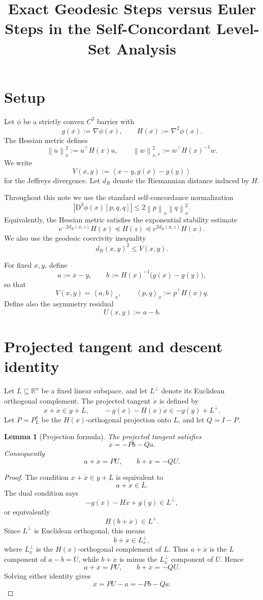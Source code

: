 \documentclass[11pt]{article}
\title{Exact Geodesic Steps versus Euler Steps in the Self-Concordant Level-Set Analysis}
\author{}
\date{}
\newtheorem{lemma}{Lemma}
\newcommand{\ip}[2]{\left\langle #1,#2\right\rangle}
\newcommand{\norm}[1]{\left\lVert #1\right\rVert}
\newcommand{\R}{\mathbb R}
\newcommand{\D}{\mathrm D}
\begin{document}
\maketitle

\section{Setup}

Let $\phi$ be a strictly convex $C^3$ barrier with
\[
    g(x):=\nabla \phi(x),
    \qquad
    H(x):=\nabla^2\phi(x).
\]
The Hessian metric defines
\[
    \norm{u}_x^2:=u^\top H(x)u,
    \qquad
    \norm{w}_{x,*}^2:=w^\top H(x)^{-1}w.
\]
We write
\[
    V(x,y):=\ip{x-y}{g(x)-g(y)}
\]
for the Jeffreys divergence. Let $d_R$ denote the Riemannian distance induced by $H$.

Throughout this note we use the standard self-concordance normalization
\[
    |\D^3\phi(x)[p,q,q]|
    \le
    2\norm{p}_x\norm{q}_x^2.
\]
Equivalently, the Hessian metric satisfies the exponential stability estimate
\[
    e^{-2d_R(x,z)}H(x)
    \preceq
    H(z)
    \preceq
    e^{2d_R(x,z)}H(x).
\]
We also use the geodesic coercivity inequality
\[
    d_R(x,y)^2\le V(x,y).
\]

For fixed $x,y$, define
\[
    a:=x-y,
    \qquad
    b:=H(x)^{-1}\bigl(g(x)-g(y)\bigr),
\]
so that
\[
    V(x,y)=\ip{a}{b}_x,
    \qquad
    \ip{p}{q}_x:=p^\top H(x)q.
\]
Define also the asymmetry residual
\[
    U(x,y):=a-b.
\]

\section{Projected tangent and descent identity}

Let $L\subseteq \R^n$ be a fixed linear subspace, and let $L^\perp$ denote its Euclidean orthogonal complement. The projected tangent $\dot x$ is defined by
\[
    x+\dot x\in y+L,
    \qquad
    -g(x)-H(x)\dot x\in -g(y)+L^\perp.
\]
Let $P=P_L^x$ be the $H(x)$-orthogonal projection onto $L$, and let $Q=I-P$.

\begin{lemma}[Projection formula]
The projected tangent satisfies
\[
    \dot x=-Pb-Qa.
\]
Consequently
\[
    a+\dot x=PU,
    \qquad
    b+\dot x=-QU.
\]
\end{lemma}

\begin{proof}
The condition $x+\dot x\in y+L$ is equivalent to
\[
    a+\dot x\in L.
\]
The dual condition says
\[
    -g(x)-H\dot x+g(y)\in L^\perp,
\]
or equivalently
\[
    H(b+\dot x)\in L^\perp.
\]
Since $L^\perp$ is Euclidean orthogonal, this means
\[
    b+\dot x\in L_x^\perp,
\]
where $L_x^\perp$ is the $H(x)$-orthogonal complement of $L$.
Thus $a+\dot x$ is the $L$ component of $a-b=U$, while $b+\dot x$ is minus the $L_x^\perp$ component of $U$. Hence
\[
    a+\dot x=PU,
    \qquad
    b+\dot x=-QU.
\]
Solving either identity gives
\[
    \dot x=PU-a=-Pb-Qa.
\]
\end{proof}
\end{document}
